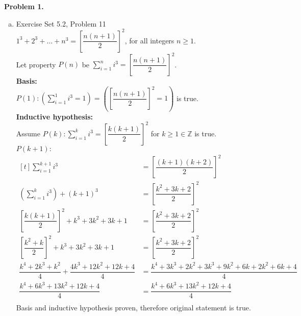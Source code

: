 \documentclass[letterpaper,fleqn,leqno]{article}
\begin{document}
	\newcommand{\chunk}[1]{
		\item 
		\begin{minipage}[t]{\textwidth}
			#1
		\end{minipage}
	}
	\newcommand{\set}[3]{
		\chunk{
			Exercise Set 5.#1, Problem #2 \\
			#3
		}
	}
	\newcommand{\sets}[3]{
		\chunk{
			Exercise Set 5.#1, Problems #2 \\
			#3
		}
	}
	\newcommand{\Sum}[2]{\displaystyle\sum\limits_{#1}^{#2}}
	\newcommand{\Prod}[2]{\displaystyle\prod\limits_{#1}^{#2}}
	
	\noindent \textbf{Problem 1.}
	\begin{enumerate}[(a)]
		\set{2}{11}{
			$1^3+2^3+\dots+n^3=\left[\dfrac{n(n+1)}{2}\right]^2$, for all integers $n\geq1$. \\
			Let property $P(n)$ be $\Sum{i=1}{n} i^3=\left[\dfrac{n(n+1)}{2}\right]^2$. \\
			\textbf{Basis:} \\
			$P(1): \left(\Sum{i=1}{1} i^3=1\right)=\left(\left[\dfrac{n(n+1)}{2}\right]^2=1\right)$ is true. \\
			\textbf{Inductive hypothesis:} \\
			Assume $P(k): \Sum{i=1}{k} i^3=\left[\dfrac{k(k+1)}{2}\right]^2$ for $k\geq1\in\mathbb{Z}$ is true. \\
			$P(k+1):$ \\
			$\begin{aligned}[t]
				\Sum{i=1}{k+1} i^3 &= \left[\dfrac{(k+1)(k+2)}{2}\right]^2 \\
				\left(\Sum{i=1}{k}i^3\right)+(k+1)^3 &= \left[\dfrac{k^2+3k+2}{2}\right]^2 \\
				\left[\dfrac{k(k+1)}{2}\right]^2+k^3+3k^2+3k+1 &= \left[\dfrac{k^2+3k+2}{2}\right]^2 \\
				\left[\dfrac{k^2+k}{2}\right]^2+k^3+3k^2+3k+1 &= \left[\dfrac{k^2+3k+2}{2}\right]^2 \\
				\dfrac{k^4+2k^3+k^2}{4}+\dfrac{4k^3+12k^2+12k+4}{4} &= \dfrac{k^4+3k^3+2k^2+3k^3+9k^2+6k+2k^2+6k+4}{4} \\
				\dfrac{k^4+6k^3+13k^2+12k+4}{4} &= \dfrac{k^4+6k^3+13k^2+12k+4}{4} \\
			\end{aligned}$ \\
			Basis and inductive hypothesis proven, therefore original statement is true. \\
		}
			

\end{enumerate}
\end{document}
